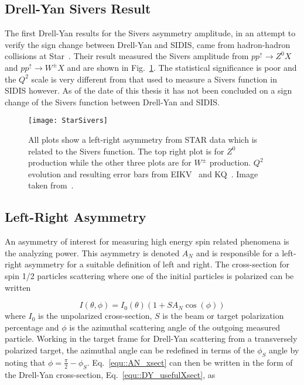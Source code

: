\subsection{Drell-Yan Sivers Result}
The first Drell-Yan results for the Sivers asymmetry amplitude, in an attempt to
verify the sign change between Drell-Yan and SIDIS, came from hadron-hadron
collisions at Star~\cite{PhysRevLett.116.132301}.  Their result measured the
Sivers amplitude from $pp^{\uparrow} \rightarrow Z^0X$ and $pp^{\uparrow}
\rightarrow W^{\pm}X$ and are shown in Fig.~\ref{fig::StarSivers}.  The
statistical significance is poor and the $Q^2$ scale is very different from that
used to measure a Sivers function in SIDIS however.  As of the date of this
thesis it has not been concluded on a sign change of the Sivers function between
Drell-Yan and SIDIS.

\begin{figure}[h!t]
  \centering
  \texttt{[image: StarSivers]}
  \caption{All plots show a left-right asymmetry from STAR data which is related
    to the Sivers function.  The top right plot is for $Z^0$ production while
    the other three plots are for $W^\pm$ production.  $Q^2$ evolution and
    resulting error bars from EIKV~\cite{PhysRevD.89.074013} and
    KQ~\cite{PhysRevLett.103.172001}.  Image taken
    from~\cite{PhysRevLett.116.132301}.}
  \label{fig::StarSivers}
\end{figure}

\subsection{Left-Right Asymmetry} \label{sec::lr_theory}
An asymmetry of interest for measuring high energy spin related phenomena is the
analyzing power.  This asymmetry is denoted $A_N$ and is responsible for a
left-right asymmetry for a suitable definition of left and right.  The
cross-section for spin 1/2 particles scattering where one of the initial
particles is polarized can be written

\begin{equation}
  \label{equ::AN_xsect}
  I(\theta, \phi) = I_0(\theta)(1+SA_N \cos(\phi))
\end{equation}
\noindent
where $I_0$ is the unpolarized cross-section, $S$ is the beam or target
polarization percentage and $\phi$ is the azimuthal scattering angle of the
outgoing measured particle.  Working in the target frame for Drell-Yan
scattering from a transversely polarized target, the azimuthal angle can be
redefined in terms of the $\phi_S$ angle by noting that $\phi = \frac{\pi}{2} -
\phi_S$. Eq.~\ref{equ::AN_xsect} can then be written in the form of the
Drell-Yan cross-section, Eq.~\ref{equ::DY_usefulXsect}, as

